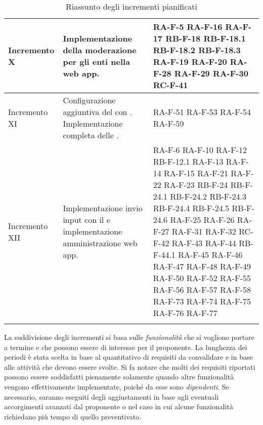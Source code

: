 \begin{center}
\begin{longtable}{|p{2.5cm}|p{6.5cm}|p{6cm}|}
		Incremento X    & Implementazione della moderazione per gli enti nella web app.                                                                                                                                  & RA-F-5 RA-F-16 RA-F-17 RB-F-18 RB-F-18.1 RB-F-18.2 RB-F-18.3 RA-F-19 RA-F-20 RA-F-28 RA-F-29 RA-F-30  RC-F-41                                                                                                                                                                                                                                                  \\	\hline
		Incremento XI   & Configurazione aggiuntiva del \glock{gateway} con \glock{Kafka}. Implementazione completa delle \glock{API}.                                                                                   & RA-F-51 RA-F-53 RA-F-54 RA-F-59                                                                                                                                                                                                                                                                                                                                \\ \hline
		Incremento XII  & Implementazione invio input con il \glock{bot Telegram} e implementazione amministrazione web app.                                                                                             & RA-F-6 RA-F-10 RA-F-12 RB-F-12.1 RA-F-13 RA-F-14 RA-F-15 RA-F-21 RA-F-22 RA-F-23 RB-F-24 RB-F-24.1 RB-F-24.2 RB-F-24.3 RB-F-24.4 RB-F-24.5 RB-F-24.6 RA-F-25 RA-F-26 RA-F-27 RA-F-31 RA-F-32 RC-F-42 RA-F-43 RA-F-44 RB-F-44.1 RA-F-45 RA-F-46 RA-F-47 RA-F-48 RA-F-49 RA-F-50 RA-F-52 RA-F-55 RA-F-56 RA-F-57 RA-F-58 RA-F-73 RA-F-74 RA-F-75 RA-F-76 RA-F-77 \\	\hline
		\caption{Riassunto degli incrementi pianificati}
	\end{longtable}
\end{center}
La suddivisione degli incrementi si basa sulle \textit{funzionalità} che si vogliono portare a termine e che possono essere di interesse per il proponente. La lunghezza dei periodi è stata scelta in base al quantitativo di requisiti da convalidare e in base alle attività che devono essere svolte. Si fa notare che molti dei requisiti riportati possono essere soddisfatti pienamente solamente quando altre funzionalità vengono effettivamente implementate, poiché da esse sono \textit{dipendenti}.
\newline
Se necessario, saranno eseguiti degli aggiustamenti in base agli eventuali accorgimenti avanzati dal proponente o nel caso in cui alcune funzionalità richiedano più tempo di quello preventivato.